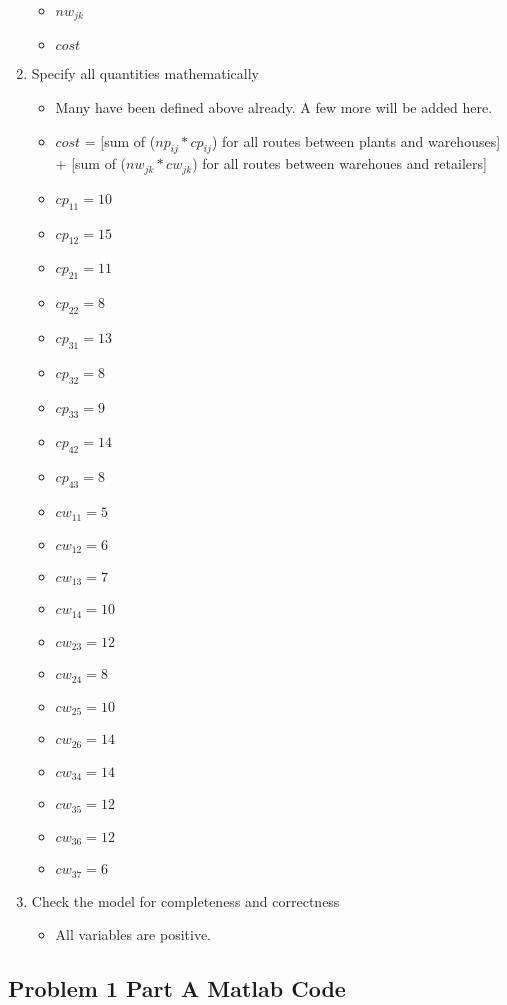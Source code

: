 \documentclass[../report/main.tex]{subfiles}
\begin{document}
\begin{enumerate}[1.]
\begin{itemize}
		\item $nw_{jk}$
		\item $cost$
	\end{itemize}
	\item Specify all quantities mathematically
	\begin{itemize}
		\item Many have been defined above already.  A few more will be added here.
		\item $cost$ = [sum of ($np_{ij}*cp_{ij}$) for all routes between plants and warehouses]
			+ [sum of ($nw_{jk}*cw_{jk}$) for all routes between warehoues and retailers]
		\item $cp_{11} = 10$
		\item $cp_{12} = 15$
		\item $cp_{21} = 11$
		\item $cp_{22} = 8$
		\item $cp_{31} = 13$
		\item $cp_{32} = 8$
		\item $cp_{33} = 9$
		\item $cp_{42} = 14$
		\item $cp_{43} = 8$
		\item $cw_{11} = 5$
		\item $cw_{12} = 6$
		\item $cw_{13} = 7$
		\item $cw_{14} = 10$
		\item $cw_{23} = 12$
		\item $cw_{24} = 8$
		\item $cw_{25} = 10$
		\item $cw_{26} = 14$
		\item $cw_{34} = 14$
		\item $cw_{35} = 12$
		\item $cw_{36} = 12$
		\item $cw_{37} = 6$
	\end{itemize}
	\item Check the model for completeness and correctness
	\begin{itemize}
	\item All variables are positive.
	\end{itemize}
\end{enumerate}
\subsection*{Problem 1 Part A Matlab Code}

\end{document}
